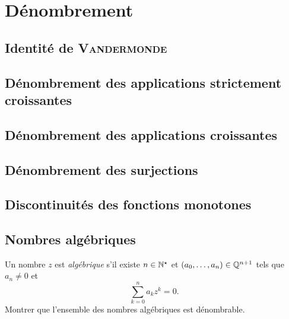 \chapter{Dénombrement}

\section{Identité de \textsc{Vandermonde}}


\section{Dénombrement des applications strictement croissantes}


\section{Dénombrement des applications croissantes}


\section{Dénombrement des surjections} \label{denombrement_surjections}


\section{Discontinuités des fonctions monotones}


\section{Nombres algébriques}
\begin{exercice}
Un nombre $z$ est \emph{algébrique} s'il existe $n \in \mathbb{N}^\star$ et $(a_0, \dots, a_n) \in \mathbb{Q}^{n+1}$ tels que $a_n \not=0$ et 
$$\sum_{k=0}^n a_k z^k = 0.$$
Montrer que l'ensemble des nombres algébriques est dénombrable. 
\end{exercice}



